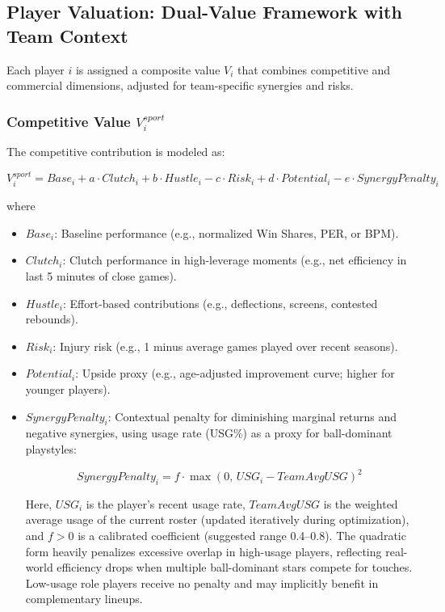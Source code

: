 \documentclass{mcmthesis}
\begin{document}
\subsection{Player Valuation: Dual-Value Framework with Team Context}

Each player $i$ is assigned a composite value $V_i$ that combines competitive and commercial dimensions, adjusted for team-specific synergies and risks.

\subsubsection{Competitive Value $V^{sport}_i$}
The competitive contribution is modeled as:

\[
V^{sport}_i = Base_i + a \cdot Clutch_i + b \cdot Hustle_i - c \cdot Risk_i + d \cdot Potential_i - e \cdot SynergyPenalty_i
\]

where
\begin{itemize}
    \item $Base_i$: Baseline performance (e.g., normalized Win Shares, PER, or BPM).
    \item $Clutch_i$: Clutch performance in high-leverage moments (e.g., net efficiency in last 5 minutes of close games).
    \item $Hustle_i$: Effort-based contributions (e.g., deflections, screens, contested rebounds).
    \item $Risk_i$: Injury risk (e.g., 1 minus average games played over recent seasons).
    \item $Potential_i$: Upside proxy (e.g., age-adjusted improvement curve; higher for younger players).
    \item $SynergyPenalty_i$: Contextual penalty for diminishing marginal returns and negative synergies, using usage rate (USG\%) as a proxy for ball-dominant playstyles:
    
    \[
    SynergyPenalty_i = f \cdot \max(0, \, USG_i - TeamAvgUSG)^2
    \]
    
    Here, $USG_i$ is the player's recent usage rate, $TeamAvgUSG$ is the weighted average usage of the current roster (updated iteratively during optimization), and $f > 0$ is a calibrated coefficient (suggested range 0.4--0.8). The quadratic form heavily penalizes excessive overlap in high-usage players, reflecting real-world efficiency drops when multiple ball-dominant stars compete for touches. Low-usage role players receive no penalty and may implicitly benefit in complementary lineups.
\end{itemize}
\end{document}
